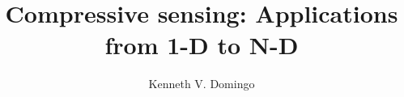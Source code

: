 \documentclass[bs]{nip3} %
\title{Compressive sensing: Applications from 1-D to N-D} %
\author{Kenneth V. Domingo} %
\begin{document}
\maketitle %
\makePrelim %






\appendix



\end{document}

